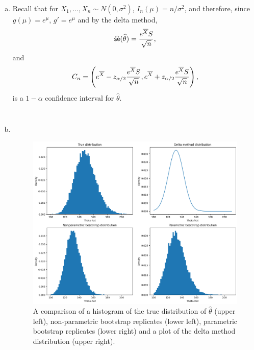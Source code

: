 \begin{ex}~
  \begin{enumerate}[(a)]
    \item Recall that for $X_1,\ldots,X_n\sim N(0,\sigma^2)$,
          $I_n(\mu)=n/\sigma^2$, and therefore, since $g(\mu)=e^\mu$,
          $g'=e^\mu$ and by the delta method,
          \[
            \widehat{\textsf{se}}(\widehat{\theta})
            =\frac{e^{\overline{X}}S}{\sqrt{n}},
          \]
          and
          \[
            C_n=\left(
            e^{\overline{X}}-z_{\alpha/2}\frac{e^{\overline{X}}S}{\sqrt{n}},
            e^{\overline{X}}+z_{\alpha/2}\frac{e^{\overline{X}}S}{\sqrt{n}}
            \right),
          \]
          is a $1-\alpha$ confidence interval for $\widehat{\theta}$.

          \inputminted{python}{../code/09-09.py}
          \inputminted{text}{../output/09-09.txt}
    \item~
          \begin{figure}[H]
            \centering
            \includegraphics[scale=0.53]{../images/09-09}
            \caption{A comparison of a histogram of the true distribution of
              $\widehat{\theta}$ (upper left), non-parametric bootstrap
              replicates (lower left), parametric bootstrap replicates
              (lower right) and a plot of the delta method distribution
              (upper right).}
          \end{figure}
  \end{enumerate}
\end{ex}

